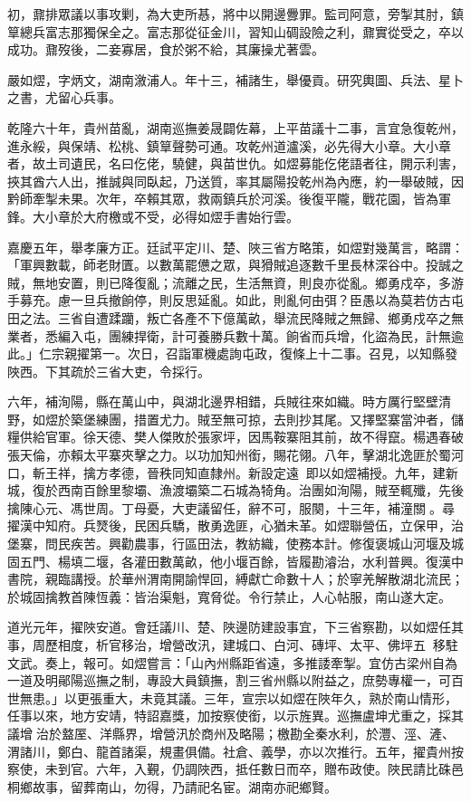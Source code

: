 \begin{pinyinscope}
初，鼐排眾議以事攻剿，為大吏所惎，將中以開邊釁罪。監司阿意，旁掣其肘，鎮筸總兵富志那獨保全之。富志那從征金川，習知山碉設險之利，鼐實從受之，卒以成功。鼐歿後，二妾寡居，食於粥不給，其廉操尤著雲。

嚴如熤，字炳文，湖南漵浦人。年十三，補諸生，舉優貢。研究輿圖、兵法、星卜之書，尤留心兵事。

乾隆六十年，貴州苗亂，湖南巡撫姜晟闢佐幕，上平苗議十二事，言宜急復乾州，進永綏，與保靖、松桃、鎮筸聲勢可通。攻乾州道瀘溪，必先得大小章。大小章者，故土司遺民，名曰仡佬，驍健，與苗世仇。如熤募能仡佬語者往，開示利害，挾其酋六人出，推誠與同臥起，乃送質，率其屬陽投乾州為內應，約一舉破賊，因黔師牽掣未果。次年，卒賴其眾，救兩鎮兵於河溪。後復平隴，戰花園，皆為軍鋒。大小章於大府檄或不受，必得如熤手書始行雲。

嘉慶五年，舉孝廉方正。廷試平定川、楚、陜三省方略策，如熤對幾萬言，略謂：「軍興數載，師老財匱。以數萬罷憊之眾，與猾賊追逐數千里長林深谷中。投誠之賊，無地安置，則已降復亂；流離之民，生活無資，則良亦從亂。鄉勇戍卒，多游手募充。慮一旦兵撤餉停，則反思延亂。如此，則亂何由弭？臣愚以為莫若仿古屯田之法。三省自遭蹂躪，叛亡各產不下億萬畝，舉流民降賊之無歸、鄉勇戍卒之無業者，悉編入屯，團練捍衛，計可養勝兵數十萬。餉省而兵增，化盜為民，計無逾此。」仁宗親擢第一。次日，召詣軍機處詢屯政，復條上十二事。召見，以知縣發陜西。下其疏於三省大吏，令採行。

六年，補洵陽，縣在萬山中，與湖北邊界相錯，兵賊往來如織。時方厲行堅壁清野，如熤於築堡練團，措置尤力。賊至無可掠，去則抄其尾。又擇堅寨當沖者，儲糧供給官軍。徐天德、樊人傑敗於張家坪，因馬鞍寨阻其前，故不得竄。楊遇春破張天倫，亦賴太平寨夾擊之力。以功加知州銜，賜花翎。八年，擊湖北逸匪於蜀河口，斬王祥，擒方孝德，晉秩同知直隸州。新設定遠，即以如熤補授。九年，建新城，復於西南百餘里黎壩、漁渡壩築二石城為犄角。治團如洵陽，賊至輒殲，先後擒陳心元、馮世周。丁母憂，大吏議留任，辭不可，服闋，十三年，補潼關。尋擢漢中知府。兵燹後，民困兵驕，散勇逸匪，心猶未革。如熤聯營伍，立保甲，治堡寨，問民疾苦。興勸農事，行區田法，教紡織，使務本計。修復褒城山河堰及城固五門、楊填二堰，各灌田數萬畝，他小堰百餘，皆履勘濬治，水利普興。復漢中書院，親臨講授。於華州渭南開諭悍回，縛獻亡命數十人；於寧羌解散湖北流民；於城固擒教首陳恆義：皆治渠魁，寬脅從。令行禁止，人心帖服，南山遂大定。

道光元年，擢陜安道。會廷議川、楚、陜邊防建設事宜，下三省察勘，以如熤任其事，周歷相度，析官移治，增營改汛，建城口、白河、磚坪、太平、佛坪五，移駐文武。奏上，報可。如熤嘗言：「山內州縣距省遠，多推諉牽掣。宜仿古梁州自為一道及明鄖陽巡撫之制，專設大員鎮撫，割三省州縣以附益之，庶勢專權一，可百世無患。」以更張重大，未竟其議。三年，宣宗以如熤在陜年久，熟於南山情形，任事以來，地方安靖，特詔嘉獎，加按察使銜，以示旌異。巡撫盧坤尤重之，採其議增治於盩厔、洋縣界，增營汛於商州及略陽；檄勘全秦水利，於灃、涇、滻、渭諸川，鄭白、龍首諸渠，規畫俱備。社倉、義學，亦以次推行。五年，擢貴州按察使，未到官。六年，入覲，仍調陜西，抵任數日而卒，贈布政使。陜民請比硃邑桐鄉故事，留葬南山，勿得，乃請祀名宦。湖南亦祀鄉賢。


\end{pinyinscope}
